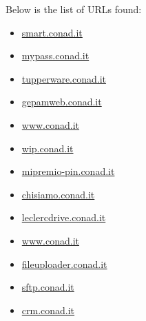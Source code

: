 \documentclass{article}
\begin{document}
Below is the list of URLs found:
\begin{itemize}
    
        
            
            \item \href{ http://smart.conad.it }{ smart.conad.it }
        
            
            \item \href{ https://mypass.conad.it/mypass/ }{ mypass.conad.it }
        
            
            \item \href{ https://tupperware.conad.it/ }{ tupperware.conad.it }
        
            
            \item \href{ http://gepamweb.conad.it }{ gepamweb.conad.it }
        
            
            \item \href{ https://www.conad.it/servizio-clienti-e-faq?utm\_source=massiva\&utm\_medium=email\&utm\_content=124717596\&utm\_campaign=\_2021\_NON\_CANCELLARE\_Test\_Proof\_Agenzia\&p1=\%2Fnegozio.007471 }{ www.conad.it }
        
            
            \item \href{ http://wip.conad.it/ }{ wip.conad.it }
        
            
            \item \href{ http://mipremio-pin.conad.it/ }{ mipremio-pin.conad.it }
        
            
            \item \href{ https://chisiamo.conad.it/ }{ chisiamo.conad.it }
        
            
            \item \href{ http://leclercdrive.conad.it/ }{ leclercdrive.conad.it }
        
            
            \item \href{ https://www.conad.it/ }{ www.conad.it }
        
            
            \item \href{ http://fileuploader.conad.it }{ fileuploader.conad.it }
        
            
            \item \href{ http://sftp.conad.it }{ sftp.conad.it }
        
            
            \item \href{ http://crm.conad.it }{ crm.conad.it }
        

\end{itemize}
\end{document}
